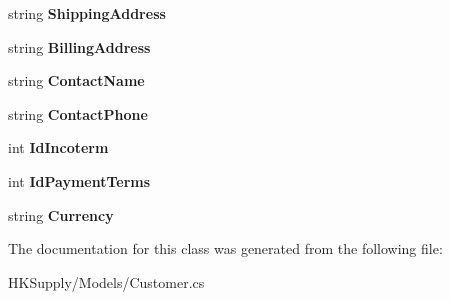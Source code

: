 \begin{DoxyCompactItemize}
\item 
\mbox{\label{class_h_k_supply_1_1_models_1_1_customer_a159313a290173e77bddbbd66c3e34193}} 
string {\bfseries Shipping\+Address}
\item 
\mbox{\label{class_h_k_supply_1_1_models_1_1_customer_a0ef5a3d143c02f5f01034f63616ec88b}} 
string {\bfseries Billing\+Address}
\item 
\mbox{\label{class_h_k_supply_1_1_models_1_1_customer_a52ec06dbf5626f8fd7b46bd0189fc0f5}} 
string {\bfseries Contact\+Name}
\item 
\mbox{\label{class_h_k_supply_1_1_models_1_1_customer_a575063986e551c006263f89b4ab6b522}} 
string {\bfseries Contact\+Phone}
\item 
\mbox{\label{class_h_k_supply_1_1_models_1_1_customer_a8ccc8450071011896a398a23746dcf53}} 
int {\bfseries Id\+Incoterm}
\item 
\mbox{\label{class_h_k_supply_1_1_models_1_1_customer_ad3c837372e9634b1450b73ac3516bd37}} 
int {\bfseries Id\+Payment\+Terms}
\item 
\mbox{\label{class_h_k_supply_1_1_models_1_1_customer_a60662a4e763416385919b83cfc18cadd}} 
string {\bfseries Currency}
\end{DoxyCompactItemize}


The documentation for this class was generated from the following file\+:\begin{DoxyCompactItemize}
\item 
H\+K\+Supply/\+Models/Customer.\+cs\end{DoxyCompactItemize}
